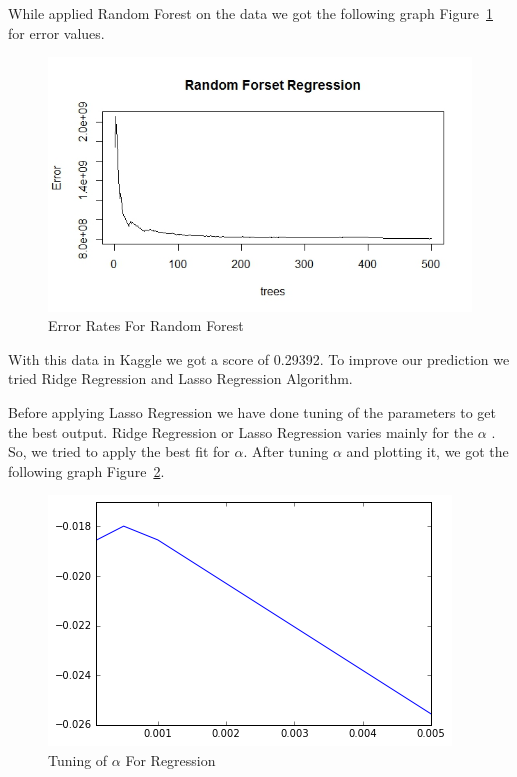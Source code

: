 \documentclass[fleqn,10pt]{SelfArx} %
\begin{document}
While applied Random Forest on the data we got the following graph Figure~\ref{fig:Figure4} for error values.

\begin{figure}[ht]\centering %
\includegraphics[width=\linewidth]{Figure4}
\caption{Error Rates For Random Forest}
\label{fig:Figure4}
\end{figure}

With this data in Kaggle we got a score of 0.29392. To improve our prediction we tried Ridge Regression and Lasso Regression Algorithm.

Before applying Lasso Regression we have done tuning of the parameters to get the best output. Ridge Regression or Lasso Regression varies mainly for the $\alpha$ . So, we tried to apply the best fit for $\alpha$.
After tuning $\alpha$ and plotting it, we got the following graph Figure~\ref{fig:Figure5}. 
\begin{figure}[ht]\centering %
\includegraphics[width=\linewidth]{Figure5}
\caption{Tuning of $\alpha$ For Regression }
\label{fig:Figure5}
\end{figure}
\end{document}

